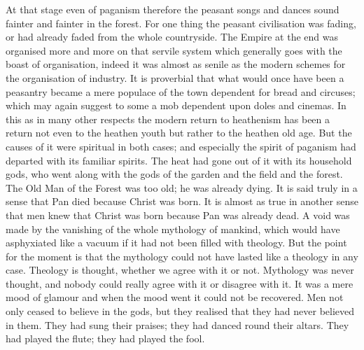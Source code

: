 At that stage even of paganism therefore the peasant songs and dances sound fainter and fainter in the forest. For one thing the peasant civilisation was fading, or had already faded from the whole countryside. The Empire at the end was organised more and more on that servile system which generally goes with the boast of organisation, indeed it was almost as senile as the modern schemes for the organisation of industry. It is proverbial that what would once have been a peasantry became a mere populace of the town dependent for bread and circuses; which may again suggest to some a mob dependent upon doles and cinemas. In this as in many other respects the modern return to heathenism has been a return not even to the heathen youth but rather to the heathen old age. But the causes of it were spiritual in both cases; and especially the spirit of paganism had departed with its familiar spirits. The heat had gone out of it with its household gods, who went along with the gods of the garden and the field and the forest. The Old Man of the Forest was too old; he was already dying. It is said truly in a sense that Pan died because Christ was born. It is almost as true in another sense that men knew that Christ was born because Pan was already dead. A void was made by the vanishing of the whole mythology of mankind, which would have asphyxiated like a vacuum if it had not been filled with theology. But the point for the moment is that the mythology could not have lasted like a theology in any case. Theology is thought, whether we agree with it or not. Mythology was never thought, and nobody could really agree with it or disagree with it. It was a mere mood of glamour and when the mood went it could not be recovered. Men not only ceased to believe in the gods, but they realised that they had never believed in them. They had sung their praises; they had danced round their altars. They had played the flute; they had played the fool.

